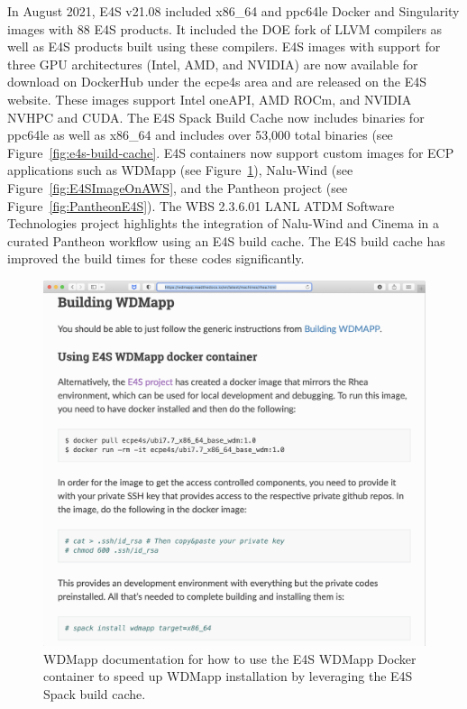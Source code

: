 In August 2021, E4S v21.08 included x86\_64 and ppc64le Docker and Singularity images with 88 E4S products. It included the DOE fork of LLVM compilers as well as E4S products built using these compilers. E4S images with support for three GPU architectures (Intel, AMD, and NVIDIA) are now available for download on DockerHub under the ecpe4s area and are released on the E4S website. These images support Intel oneAPI, AMD ROCm, and NVIDIA NVHPC and CUDA. The E4S Spack Build Cache now includes binaries for ppc64le as well as x86\_64 and includes over 53,000 total binaries (see Figure~\ref{fig:e4s-build-cache}. E4S containers now support custom images for ECP applications such as WDMapp (see Figure~\ref{fig:SpackBuildCacheWDMapp}), Nalu-Wind (see Figure~\ref{fig:E4SImageOnAWS}, and the Pantheon project (see Figure~\ref{fig:PantheonE4S}). The WBS 2.3.6.01 LANL ATDM Software Technologies project highlights the integration of Nalu-Wind and Cinema in a curated Pantheon workflow using an E4S build cache. The E4S build cache has improved the build times for these codes significantly. 
\begin{figure}
        \centering
        \includegraphics[width=0.9\linewidth]{projects/2.3.5-Ecosystem/2.3.5.01-Ecosystem-SDK/E4S_WDMApp}
        \caption{WDMapp documentation for how to use the E4S WDMapp Docker container to speed up WDMapp installation by leveraging the E4S Spack build cache.}
        \label{fig:SpackBuildCacheWDMapp}
\end{figure}

